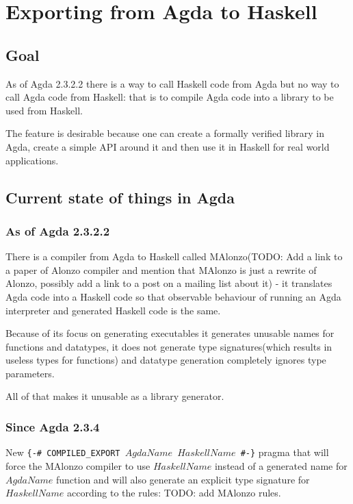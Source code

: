 \section{Exporting from Agda to Haskell}

\subsection{Goal}

As of Agda 2.3.2.2 there is a way to call Haskell code from Agda but no way to call Agda code from Haskell:
that is to compile Agda code into a library to be used from Haskell.

The feature is desirable because one can create a formally verified library in Agda, create a simple API
around it and then use it in Haskell for real world applications.

\subsection{Current state of things in Agda}

\subsubsection{As of Agda 2.3.2.2}

There is a compiler from Agda to Haskell called MAlonzo(TODO: Add a link to a paper of Alonzo compiler and mention that
MAlonzo is just a rewrite of Alonzo, possibly add a link to a post on a mailing list about it) - it translates Agda code
into a Haskell code so that observable behaviour of running an Agda interpreter and generated Haskell code is the same.

Because of its focus on generating executables it generates unusable names for functions and datatypes, it does not
generate type signatures(which results in useless types for functions) and datatype generation completely ignores
type parameters.

All of that makes it unusable as a library generator.

\subsubsection{Since Agda 2.3.4}

New \texttt{\{-\# COMPILED\_EXPORT \(AgdaName\) \(HaskellName\) \#-\}} pragma that will force the
MAlonzo compiler to use \(HaskellName\) instead of a generated name for \(AgdaName\) function and will
also generate an explicit type signature for \(HaskellName\) according to the rules: TODO: add MAlonzo rules.

